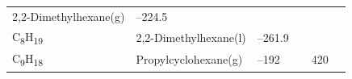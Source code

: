 \documentclass[
]{book}
\theoremstyle{definition}
\theoremstyle{definition}
\theoremstyle{definition}
\theoremstyle{remark}
\begin{document}
\begin{longtable}[]{@{}llllll@{}}
\begin{minipage}[t]{0.17\columnwidth}
2,2-Dimethylhexane(g)\strut
\end{minipage} & \begin{minipage}[t]{0.15\columnwidth}\raggedright
--224.5\strut
\end{minipage} & \begin{minipage}[t]{0.15\columnwidth}\raggedright
\strut
\end{minipage} & \begin{minipage}[t]{0.14\columnwidth}\raggedright
\strut
\end{minipage} & \begin{minipage}[t]{0.14\columnwidth}\raggedright
\strut
\end{minipage}\tabularnewline
\begin{minipage}[t]{0.07\columnwidth}\raggedright
C\textsubscript{8}H\textsubscript{19}\strut
\end{minipage} & \begin{minipage}[t]{0.17\columnwidth}\raggedright
2,2-Dimethylhexane(l)\strut
\end{minipage} & \begin{minipage}[t]{0.15\columnwidth}\raggedright
--261.9\strut
\end{minipage} & \begin{minipage}[t]{0.15\columnwidth}\raggedright
\strut
\end{minipage} & \begin{minipage}[t]{0.14\columnwidth}\raggedright
\strut
\end{minipage} & \begin{minipage}[t]{0.14\columnwidth}\raggedright
\strut
\end{minipage}\tabularnewline
\begin{minipage}[t]{0.07\columnwidth}\raggedright
C\textsubscript{9}H\textsubscript{18}\strut
\end{minipage} & \begin{minipage}[t]{0.17\columnwidth}\raggedright
Propylcyclohexane(g)\strut
\end{minipage} & \begin{minipage}[t]{0.15\columnwidth}\raggedright
--192\strut
\end{minipage} & \begin{minipage}[t]{0.15\columnwidth}\raggedright
\strut
\end{minipage} & \begin{minipage}[t]{0.14\columnwidth}\raggedright
420\strut
\end{minipage} & \begin{minipage}[t]{0.14\columnwidth}\raggedright

\end{minipage}
\end{longtable}
\end{document}
